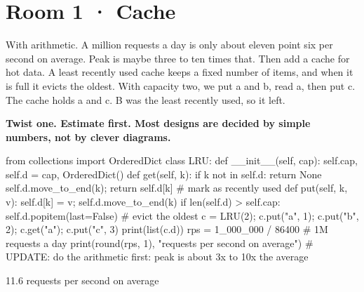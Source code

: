 \documentclass[11pt,a4paper]{report}
\begin{document}
\section*{Room 1 · Cache}
With arithmetic. A million requests a day is only about eleven point six per second on average. Peak is maybe three to ten times that. Then add a cache for hot data. A least recently used cache keeps a fixed number of items, and when it is full it evicts the oldest. With capacity two, we put a and b, read a, then put c. The cache holds a and c. B was the least recently used, so it left.
\begin{tcolorbox}[colback=yellow!12,colframe=orange!70!black,boxrule=0.4pt,left=4pt,right=4pt,top=2pt,bottom=2pt]\textbf{Twist one. Estimate first. Most designs are decided by simple numbers, not by clever diagrams.}\end{tcolorbox}
\begin{Code}
from collections import OrderedDict
class LRU:
    def __init__(self, cap): self.cap, self.d = cap, OrderedDict()
    def get(self, k):
        if k not in self.d: return None
        self.d.move_to_end(k); return self.d[k]       # mark as recently used
    def put(self, k, v):
        self.d[k] = v; self.d.move_to_end(k)
        if len(self.d) > self.cap: self.d.popitem(last=False)   # evict the oldest
c = LRU(2); c.put("a", 1); c.put("b", 2); c.get("a"); c.put("c", 3)
print(list(c.d))
rps = 1_000_000 / 86400                     # 1M requests a day
print(round(rps, 1), "requests per second on average")
# UPDATE: do the arithmetic first: peak is about 3x to 10x the average
\end{Code}
\begin{Out}
['a', 'c']
11.6 requests per second on average
\end{Out}
\end{document}
